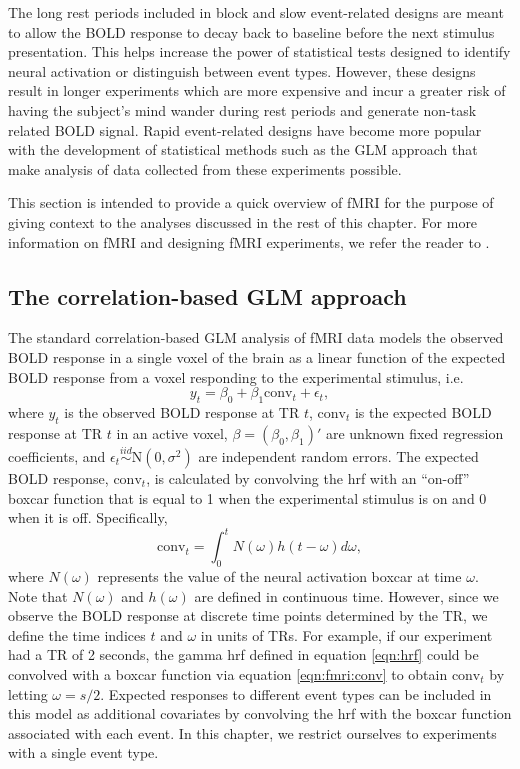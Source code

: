 The long rest periods included in block and slow event-related designs are meant to allow the BOLD response to decay back to baseline before the next stimulus presentation. This helps increase the power of statistical tests designed to identify neural activation or distinguish between event types. However, these designs result in longer experiments which are more expensive and incur a greater risk of having the subject's mind wander during rest periods and generate non-task related BOLD signal. Rapid event-related designs have become more popular with the development of statistical methods such as the GLM approach that make analysis of data collected from these experiments possible.

This section is intended to provide a quick overview of fMRI for the purpose of giving context to the analyses discussed in the rest of this chapter. For more information on fMRI and designing fMRI experiments, we refer the reader to \citet{ashby:fmri:2011,pold:fmri:2011}.

\subsection{The correlation-based GLM approach \label{sec:fmri:glm}}

The standard correlation-based GLM analysis of fMRI data models the observed BOLD response in a single voxel of the brain as a linear function of the expected BOLD response from a voxel responding to the experimental stimulus, i.e.
\begin{equation}
y_t = \beta_0 + \beta_1\mbox{conv}_t + \epsilon_t, \label{eqn:fmri:glm}
\end{equation}
where $y_t$ is the observed BOLD response at TR $t$, $\mbox{conv}_t$ is the expected BOLD response at TR $t$ in an active voxel, $\beta = (\beta_0,\beta_1)'$ are unknown fixed regression coefficients, and $\epsilon_t \stackrel{iid}{\sim} \mbox{N}(0,\sigma^2)$ are independent random errors. The expected BOLD response, $\mbox{conv}_t$, is calculated by convolving the hrf with an ``on-off'' boxcar function that is equal to 1 when the experimental stimulus is on and 0 when it is off. Specifically,
\begin{equation}
\mbox{conv}_t = \int_0^t N(\omega)h(t-\omega)d\omega, \label{eqn:fmri:conv}
\end{equation}
where $N(\omega)$ represents the value of the neural activation boxcar at time $\omega$. Note that $N(\omega)$ and $h(\omega)$ are defined in continuous time. However, since we observe the BOLD response at discrete time points determined by the TR, we define the time indices $t$ and $\omega$ in units of TRs. For example, if our experiment had a TR of 2 seconds, the gamma hrf defined in equation \eqref{eqn:hrf} could be convolved with a boxcar function via equation \eqref{eqn:fmri:conv} to obtain $\mbox{conv}_t$ by letting $\omega = s/2$. Expected responses to different event types can be included in this model as additional covariates by convolving the hrf with the boxcar function associated with each event. In this chapter, we restrict ourselves to experiments with a single event type.

